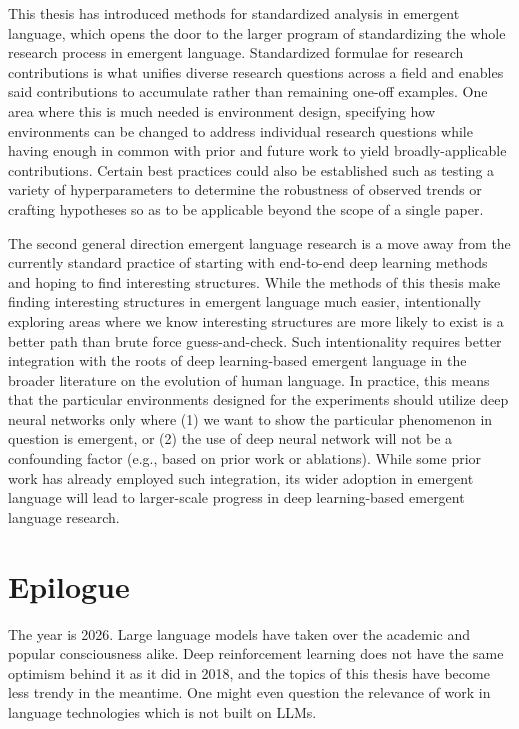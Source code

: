 This thesis has introduced methods for standardized analysis in emergent language, which opens the door to the larger program of standardizing the whole research process in emergent language.
Standardized formulae for research contributions is what unifies diverse research questions across a field and enables said contributions to accumulate rather than remaining one-off examples.
One area where this is much needed is environment design, specifying how environments can be changed to address individual research questions while having enough in common with prior and future work to yield broadly-applicable contributions.
Certain best practices could also be established such as testing a variety of hyperparameters to determine the robustness of observed trends or crafting hypotheses so as to be applicable beyond the scope of a single paper.

The second general direction emergent language research is a move away from the currently standard practice of starting with end-to-end deep learning methods and hoping to find interesting structures.
While the methods of this thesis make finding interesting structures in emergent language much easier, intentionally exploring areas where we know interesting structures are more likely to exist is a better path than brute force guess-and-check.
Such intentionality requires better integration with the roots of deep learning-based emergent language in the broader literature on the evolution of human language.
In practice, this means that the particular environments designed for the experiments should utilize deep neural networks only where
  (1) we want to show the particular phenomenon in question is emergent,
  or (2) the use of deep neural network will not be a confounding factor (e.g., based on prior work or ablations).
While some prior work has already employed such integration, its wider adoption in emergent language will lead to larger-scale progress in deep learning-based emergent language research.



\chapter*{Epilogue}
The year is 2026.
Large language models have taken over the academic and popular consciousness alike.
Deep reinforcement learning does not have the same optimism behind it as it did in 2018,
  and the topics of this thesis have become less trendy in the meantime.
One might even question the relevance of work in language technologies which is not built on LLMs.

